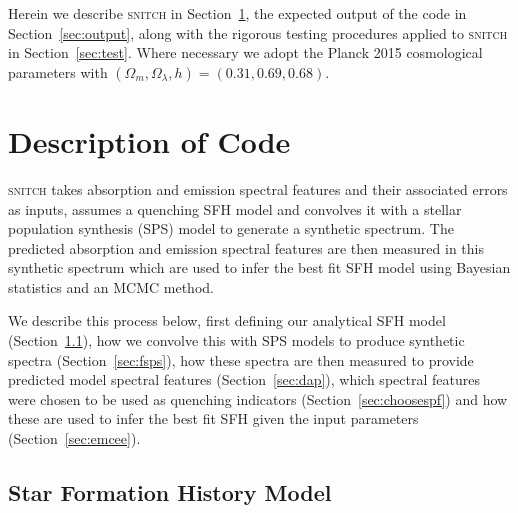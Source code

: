 \documentclass[useAMS,usenatbib]{mn2e}
\begin{document}

Herein we describe \textsc{snitch} in Section~\ref{sec:code}, the expected output of the code in Section~\ref{sec:output}, along with the rigorous testing procedures applied to \textsc{snitch} in Section~\ref{sec:test}. Where necessary we adopt the Planck 2015 \citep{planck16} cosmological parameters with $(\Omega_m, \Omega_{\lambda}, h) = (0.31, 0.69, 0.68)$. 

\section{Description of Code}\label{sec:code}

\textsc{snitch} takes absorption and emission spectral features and their associated errors as inputs, assumes a quenching SFH model and convolves it with a stellar population synthesis (SPS) model to generate a synthetic spectrum. The predicted absorption and emission spectral features are then measured in this synthetic spectrum which are used to infer the best fit SFH model using Bayesian statistics and an MCMC method. 

We describe this process below, first defining our analytical SFH model (Section~\ref{sec:sfh}), how we convolve this with SPS models to produce synthetic spectra (Section~\ref{sec:fsps}), how these spectra are then measured to provide predicted model spectral features (Section~\ref{sec:dap}), which spectral features were chosen to be used as quenching indicators (Section~\ref{sec:choosespf}) and how these are used to infer the best fit SFH given the input parameters (Section~\ref{sec:emcee}). 

\subsection{Star Formation History Model}\label{sec:sfh}
\end{document}

